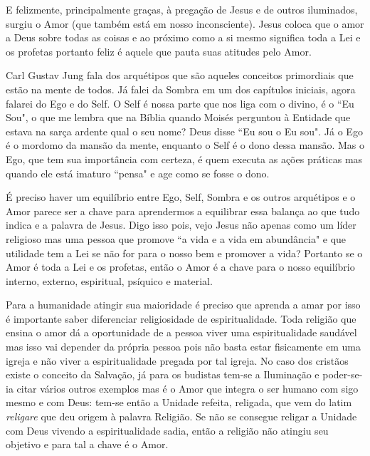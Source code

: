 \emdash{}E felizmente, principalmente graças, à pregação de Jesus e de outros iluminados, surgiu o Amor (que também está em nosso inconsciente). Jesus coloca que o amor a Deus sobre todas as coisas e ao próximo como a si mesmo significa toda a Lei e os profetas portanto feliz é aquele que pauta suas atitudes pelo Amor.

\emdash{}Carl Gustav Jung fala dos arquétipos que são aqueles conceitos primordiais que estão na mente de todos. Já falei da Sombra em um dos capítulos iniciais, agora falarei do Ego e do Self. O Self é nossa parte que nos liga com o divino, é o ``Eu Sou", o que me lembra que na Bíblia quando Moisés perguntou à Entidade que estava na sarça ardente qual o seu nome? Deus disse ``Eu sou o Eu sou". Já o Ego é o mordomo da mansão da mente, enquanto o Self é o dono dessa mansão. Mas o Ego, que tem sua importância com certeza, é quem executa as ações práticas mas quando ele está imaturo ``pensa" e age como se fosse o dono.

\emdash{}É preciso haver um equilíbrio entre Ego, Self, Sombra e os outros arquétipos e o Amor parece ser a chave para aprendermos a equilibrar essa balança ao que tudo indica e a palavra de Jesus. Digo isso pois, vejo Jesus não apenas como um líder religioso mas uma pessoa que promove ``a vida e a vida em abundância" e que utilidade tem a Lei se não for para o nosso bem e promover a vida? Portanto se o Amor é toda a Lei e os profetas, então o Amor é a chave para o nosso equilíbrio interno, externo, espiritual, psíquico e material.

\emdash{}Para a humanidade atingir sua maioridade é preciso que aprenda a amar por isso é importante saber diferenciar religiosidade de espiritualidade. Toda religião que ensina o amor dá a oportunidade de a pessoa viver uma espiritualidade saudável mas isso vai depender da própria pessoa pois não basta estar fisicamente em uma igreja e não viver a espiritualidade pregada por tal igreja. No caso dos cristãos existe o conceito da Salvação, já para os budistas tem-se a Iluminação e poder-se-ia citar vários outros exemplos mas é o Amor que integra o ser humano com sigo mesmo e com Deus: tem-se então a Unidade refeita, religada, que vem do latim \textit{religare} que deu origem à palavra Religião. Se não se consegue religar a Unidade com Deus vivendo a espiritualidade sadia, então a religião não atingiu seu objetivo e para tal a chave é o Amor.